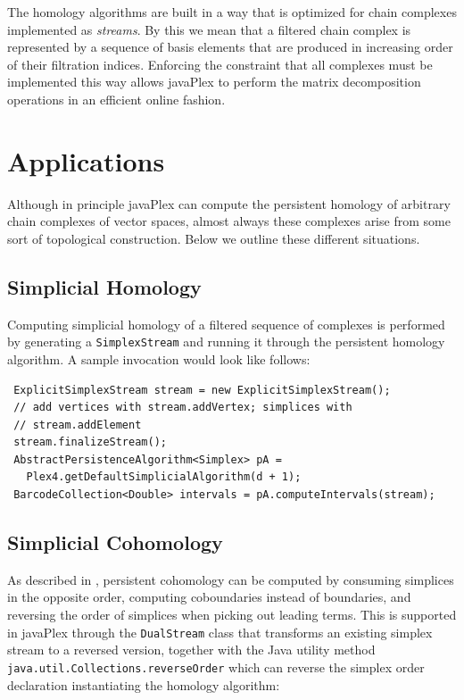 The homology algorithms are built in a way that is optimized for chain complexes implemented as \emph{streams}. By this we mean that a filtered chain complex is represented by a sequence of basis elements that are produced in increasing order of their filtration indices. Enforcing the constraint that all complexes must be implemented this way allows javaPlex to perform the matrix decomposition operations in an efficient online fashion.

\section{Applications}

Although in principle javaPlex can compute the persistent homology of arbitrary chain complexes of vector spaces, almost always these complexes arise from some sort of topological construction. Below we outline these different situations.

\subsection{Simplicial Homology}
\label{sec:simplicial-homology}

Computing simplicial homology of a filtered sequence of complexes is
performed by generating a \texttt{SimplexStream} and running it
through the persistent homology algorithm. A sample invocation would look
like follows:

\begin{verbatim}
 ExplicitSimplexStream stream = new ExplicitSimplexStream();
 // add vertices with stream.addVertex; simplices with
 // stream.addElement
 stream.finalizeStream();
 AbstractPersistenceAlgorithm<Simplex> pA = 
   Plex4.getDefaultSimplicialAlgorithm(d + 1);
 BarcodeCollection<Double> intervals = pA.computeIntervals(stream);
\end{verbatim}

\subsection{Simplicial Cohomology}
\label{sec:simpl-cohom-1}

As described in \cite{Dualities}, persistent cohomology can be
computed by consuming simplices in the opposite order, computing
coboundaries instead of boundaries, and reversing the order of
simplices when picking out leading terms. This is supported in
javaPlex through the \texttt{DualStream} class that transforms an
existing simplex stream to a reversed version, together with the Java
utility method
\texttt{java.util.Collections.reverseOrder} which can reverse the
simplex order declaration instantiating the homology algorithm:

